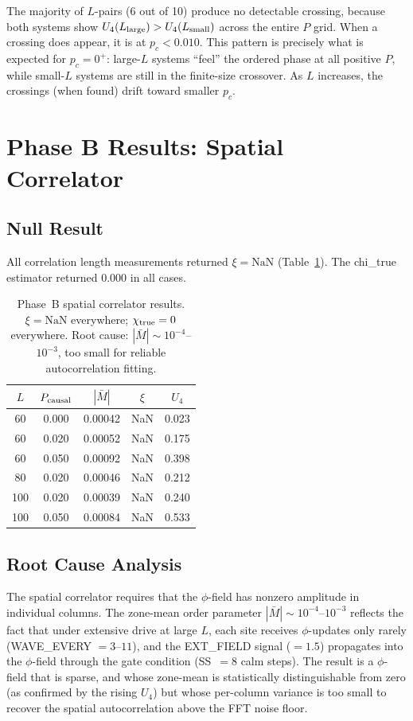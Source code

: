 \documentclass[12pt,a4paper]{article}
\begin{document}
The majority of $L$-pairs (6 out of 10) produce no detectable crossing,
because both systems show $U_4(L_{\rm large}) > U_4(L_{\rm small})$
across the entire $P$ grid.
When a crossing does appear, it is at $p_c < 0.010$.
This pattern is precisely what is expected for $p_c = 0^+$:
large-$L$ systems ``feel'' the ordered phase at all positive $P$,
while small-$L$ systems are still in the finite-size crossover.
As $L$ increases, the crossings (when found) drift toward smaller $p_c$.

\section{Phase B Results: Spatial Correlator}

\subsection{Null Result}

All correlation length measurements returned $\xi = \mathrm{NaN}$
(Table~\ref{tab:xi}).
The chi\_true estimator returned 0.000 in all cases.

\begin{table}[h]
\centering
\caption{Phase~B spatial correlator results.
$\xi = \mathrm{NaN}$ everywhere; $\chi_{\rm true} = 0$ everywhere.
Root cause: $|\bar{M}| \sim 10^{-4}$--$10^{-3}$,
too small for reliable autocorrelation fitting.}
\label{tab:xi}
\begin{tabular}{ccccc}
\toprule
$L$ & $P_{\rm causal}$ & $|\bar{M}|$ & $\xi$ & $U_4$ \\
\midrule
60 & 0.000 & 0.00042 & NaN & 0.023 \\
60 & 0.020 & 0.00052 & NaN & 0.175 \\
60 & 0.050 & 0.00092 & NaN & 0.398 \\
80 & 0.020 & 0.00046 & NaN & 0.212 \\
100 & 0.020 & 0.00039 & NaN & 0.240 \\
100 & 0.050 & 0.00084 & NaN & 0.533 \\
\bottomrule
\end{tabular}
\end{table}

\subsection{Root Cause Analysis}

The spatial correlator requires that the $\phi$-field has nonzero amplitude
in individual columns.
The zone-mean order parameter $|\bar{M}| \sim 10^{-4}$--$10^{-3}$ reflects
the fact that under extensive drive at large $L$, each site receives
$\phi$-updates only rarely (WAVE\_EVERY $= 3$--$11$),
and the EXT\_FIELD signal ($= 1.5$) propagates into the $\phi$-field
through the gate condition (SS~$= 8$ calm steps).
The result is a $\phi$-field that is sparse, and whose zone-mean is
statistically distinguishable from zero (as confirmed by the rising $U_4$)
but whose per-column variance is too small to recover
the spatial autocorrelation above the FFT noise floor.
\end{document}
